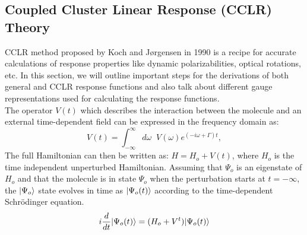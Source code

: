 \subsection{Coupled Cluster Linear Response (CCLR) Theory}
CCLR method proposed by Koch and J{\o}rgensen in 1990\cite{Koch90} is a recipe for accurate
calculations of response properties like dynamic polarizabilities, optical
rotations, etc. In this section, we will outline important steps for the
derivations of both general and CCLR response functions and also talk about
different gauge representations used for calculating the response functions.\\
The operator $V(t)$ which describes the interaction between the molecule and 
an external time-dependent field can be expressed in the frequency domain as: 
\begin{equation}
V(t) = \int_{-\infty}^{\infty}d\omega\;\;V(\omega) e^{(-i\omega + \Gamma)t} ,
\end{equation}
The full Hamiltonian can then be written as: $H = H_o + V(t)$, where $H_o$ is the
time independent unperturbed Hamiltonian. Assuming that $\Psi_o$ is an eigenstate of $H_o$
and that the molecule is in state $\Psi_o$ when the perturbation starts at $t = -\infty$, 
the $| \Psi_o \rangle$ state evolves in time as $| \Psi_o(t) \rangle$ according to the time-dependent 
Schr\"odinger equation.
\begin{equation}
i\frac{d}{dt}| \Psi_o(t) \rangle = (H_o + V^t)| \Psi_o(t) \rangle
\end{equation}
